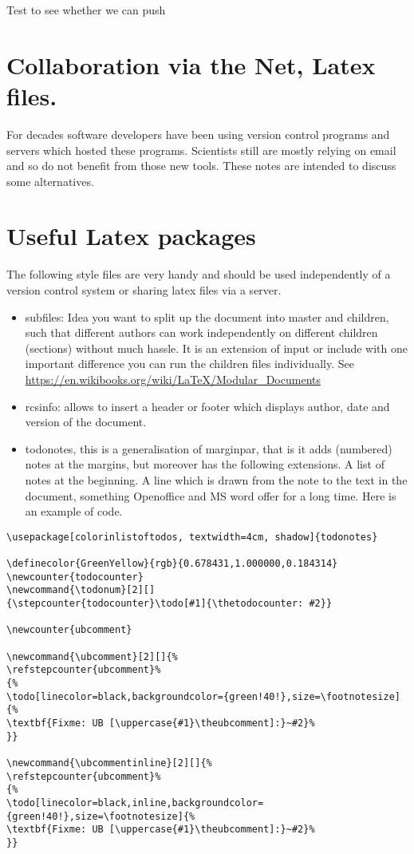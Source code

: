 \documentclass[11pt]{article}
\author{Uwe Brauer}
\date{\today}
\title{}
\begin{document}
\tableofcontents

Test to see whether we can push

\section{Collaboration via the Net, Latex files.}
\label{sec:orgheadline1}

For decades software developers have been using version control
programs and servers which hosted these programs. Scientists still are
mostly relying on email and so do not benefit from those new tools.
These notes are intended to discuss some alternatives.

\section{Useful Latex packages}
\label{sec:orgheadline2}


The following style files  are very handy and should be used
independently of a version control system or sharing latex files via a
server. 


\begin{itemize}
\item subfiles: Idea you want to split up the document into master
and children, such that different authors can work
independently on different children (sections) without much
hassle. It is an extension of input or include with one
important difference you can run the children files
individually. See  \url{https://en.wikibooks.org/wiki/LaTeX/Modular_Documents}

\item rcsinfo: allows to insert a header or footer which displays
author, date and version of the document.

\item todonotes, this is a generalisation of marginpar, that is it
adds (numbered) notes at the margins, but moreover has  the
following extensions. A list of notes at the beginning. A line
which is drawn from the note to the text in the document,
something Openoffice and MS word offer for a long time. Here is
an example of code.
\end{itemize}

\begin{verbatim}
\usepackage[colorinlistoftodos, textwidth=4cm, shadow]{todonotes}

\definecolor{GreenYellow}{rgb}{0.678431,1.000000,0.184314}
\newcounter{todocounter}
\newcommand{\todonum}[2][]
{\stepcounter{todocounter}\todo[#1]{\thetodocounter: #2}}

\newcounter{ubcomment}

\newcommand{\ubcomment}[2][]{%
\refstepcounter{ubcomment}%
{%
\todo[linecolor=black,backgroundcolor={green!40!},size=\footnotesize]{%
\textbf{Fixme: UB [\uppercase{#1}\theubcomment]:}~#2}%
}}

\newcommand{\ubcommentinline}[2][]{%
\refstepcounter{ubcomment}%
{%
\todo[linecolor=black,inline,backgroundcolor={green!40!},size=\footnotesize]{%
\textbf{Fixme: UB [\uppercase{#1}\theubcomment]:}~#2}%
}}
\end{verbatim}
\end{document}
